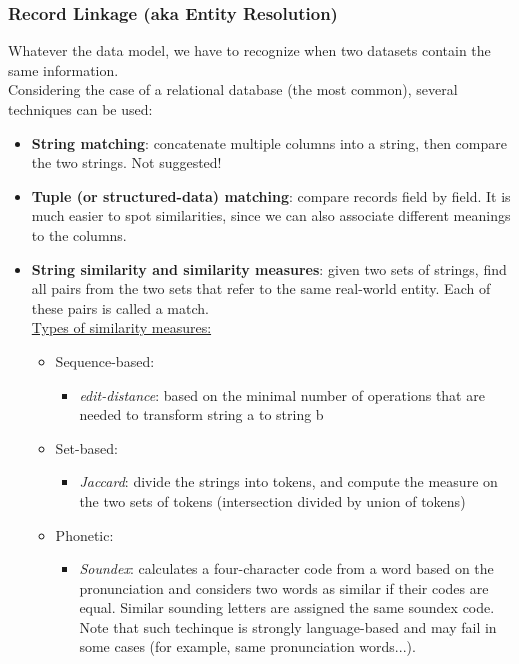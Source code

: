 \documentclass[10pt,a4paper]{article}
\begin{document}
\subsubsection{Record Linkage (aka Entity Resolution)}
\begin{justify}
Whatever the data model, we have to recognize when two datasets contain the same information. \\ 
Considering the case of a relational database (the most common), several techniques can be used:
\begin{itemize}
	\item \textbf{String matching}: concatenate multiple columns into a string, then compare the two strings. Not suggested!
	\item \textbf{Tuple (or structured-data) matching}: compare records field by field. It is much easier to spot similarities, since we can also associate different meanings to the columns.
	\item \textbf{String similarity and similarity measures}: given two sets of strings, find all pairs from the two sets that refer to the same real-world entity. Each of these pairs is called a match.  \\
	\uline{Types of similarity measures:}
	\begin{itemize}
		\item Sequence-based: 
		\begin{itemize}
			\item \textit{edit-distance}: based on the minimal number of operations that are needed to transform string a to string b
\end{itemize}
		\pagebreak
		\item Set-based:
		\begin{itemize}
			\item \textit{Jaccard}: divide the strings into tokens, and compute the measure on the two sets of tokens (intersection divided by union of tokens)
		\end{itemize}
		\item Phonetic:
		\begin{itemize}
			\item \textit{Soundex}: calculates a four-character code from a word based on the pronunciation and considers two words as similar if their codes are equal. Similar sounding letters are assigned the same soundex code. Note that such techinque is strongly language-based and may fail in some cases (for example, same pronunciation words...).
		\end{itemize}

\end{itemize}
\end{itemize}
\end{justify}
\end{document}
